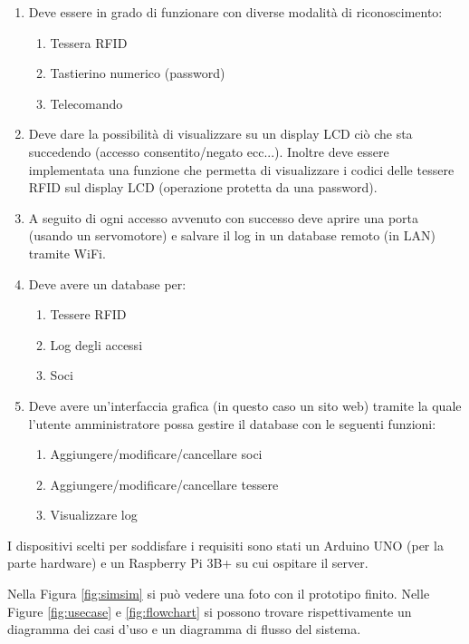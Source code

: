\documentclass[12pt]{report}
\begin{document}
\begin{enumerate}
	\item Deve essere in grado di funzionare con diverse modalità di riconoscimento:
	\begin{enumerate}
		\item Tessera RFID
		\item Tastierino numerico (password)
		\item Telecomando 
	\end{enumerate}
	\item Deve dare la possibilità di visualizzare su un display LCD ciò che sta succedendo (accesso consentito/negato ecc...). Inoltre deve essere implementata una funzione che permetta di visualizzare i codici delle tessere RFID sul display LCD (operazione protetta da una password).
	\item A seguito di ogni accesso avvenuto con successo deve aprire una porta (usando un servomotore) e salvare il log in un database remoto (in LAN) tramite WiFi.
	\item Deve avere un database per:
	\begin{enumerate}
		\item Tessere RFID
		\item Log degli accessi
		\item Soci
	\end{enumerate}
	\item Deve avere un'interfaccia grafica (in questo caso un sito web) tramite la quale l'utente amministratore possa gestire il database con le seguenti funzioni: 
	\begin{enumerate}
		\item Aggiungere/modificare/cancellare soci 
		\item Aggiungere/modificare/cancellare tessere 
		\item Visualizzare log
	\end{enumerate}
\end{enumerate}
I dispositivi scelti per soddisfare i requisiti sono stati un Arduino UNO (per la parte hardware) e un Raspberry Pi 3B+ su cui ospitare il server. 

Nella Figura \ref{fig:simsim} si può vedere una foto con il prototipo finito.
Nelle Figure \ref{fig:usecase} e \ref{fig:flowchart} si possono trovare rispettivamente un diagramma dei casi d'uso e un diagramma di flusso del sistema.
\end{document}
